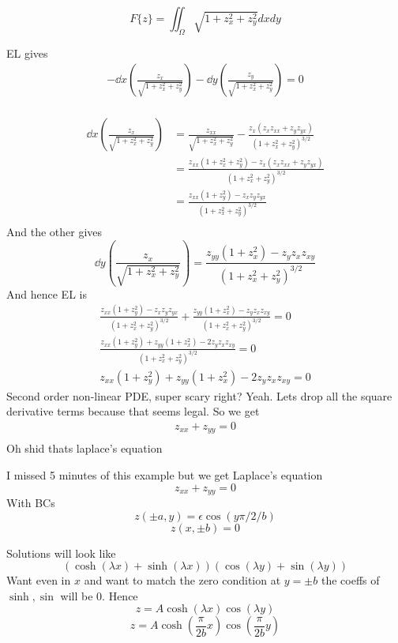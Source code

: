 \documentclass{E:/Documents/Latex/myassignment}
\begin{document}
\[F\{z\} = \iint_{\Omega} \sqrt{1+ z_x^2 + z_y^2} dxdy\]

EL gives
\begin{align*}
	- \dd{}x \left(\frac{z_x}{\sqrt{1 + z_x^2 + z_y^2}}\right) - \dd{}y \left(\frac{z_y}{\sqrt{1+z_x^2+z_y^2}}\right)=0\\
\end{align*}

\begin{align*}
	\dd{}x \left(\frac{z_x}{\sqrt{1+z_x^2+z_y^2}}\right) &= \frac{z_{xx}}{\sqrt{1+z_x^2+z_y^2}} - \frac{z_x(z_x z_{xx} + z_y z_{yx})}{(1 + z_x^2 + z_y^2)^{3/2}}\\
	&=\frac{z_{xx} (1+z_x^2 + z_y^2) - z_x(z_x z_{xx} + z_y z_{yx})}{(1 + z_x^2 + z_y^2)^{3/2}}\\
	&= \frac{z_{xx} (1+ z_y^2) - z_x z_y z_{yx}}{(1 + z_x^2 + z_y^2)^{3/2}}\\
\end{align*}
And the other gives
\[\dd{}y \left(\frac{z_x}{\sqrt{1+z_x^2+z_y^2}}\right) = \frac{z_{yy} (1+ z_x^2) - z_y z_x z_{xy}}{(1 + z_x^2 + z_y^2)^{3/2}}\]
And hence
EL is
\begin{align*}
	\frac{z_{xx} (1+ z_y^2) - z_x z_y z_{yx}}{(1 + z_x^2 + z_y^2)^{3/2}} + \frac{z_{yy} (1+ z_x^2) - z_y z_x z_{xy}}{(1 + z_x^2 + z_y^2)^{3/2}} = 0\\
	\frac{z_{xx} (1+ z_y^2) + z_{yy} (1+ z_x^2) - 2z_y z_x z_{xy}}{(1 + z_x^2 + z_y^2)^{3/2}} = 0\\
	z_{xx} (1+ z_y^2) + z_{yy} (1+ z_x^2) - 2z_y z_x z_{xy} = 0
\end{align*}
Second order non-linear PDE, super scary right? Yeah. Lets drop all the square derivative terms because that seems legal.
So we get
\begin{align*}
	z_{xx} + z_{yy} = 0\\
\end{align*}
Oh shid thats laplace's equation



I missed 5 minutes of this example but we get Laplace's equation 
\[z_{xx} + z_{yy} = 0\]
With BCs
\[z(\pm a,y ) = \epsilon \cos(y \pi/2 /b)\]
\[z(x,\pm b) = 0\]

Solutions will look like 
\[(\cosh(\lambda x) + \sinh (\lambda x) ) (\cos(\lambda y) + \sin(\lambda y))\]
Want even in $x$ and want to match the zero condition at $y = \pm b$ the coeffs of $\sinh,\sin$ will be $0$.
Hence
\[z = A \cosh(\lambda x) \cos(\lambda y)\]
\[z = A \cosh(\frac{\pi}{2b} x) \cos(\frac{\pi}{2b}  y)\]
\end{document}
